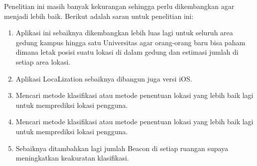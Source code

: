 Penelitian ini masih banyak kekurangan sehingga perlu dikembangkan agar menjadi lebih baik. Berikut adalah saran untuk penelitian ini:
\begin{enumerate}
	\item Aplikasi ini sebaiknya dikembangkan lebih luas lagi untuk seluruh area gedung kampus hingga satu Universitas agar orang-orang baru bisa paham dimana letak posisi suatu lokasi di dalam gedung dan estimasi jumlah di setiap area lokasi.
	\item Aplikasi LocaLization sebaiknya dibangun juga  versi iOS.
	\item Mencari metode klasifikasi atau metode penentuan lokasi yang lebih baik lagi untuk memprediksi lokasi pengguna.
	\item Mencari metode klasifikasi atau metode penentuan lokasi yang lebih baik lagi untuk memprediksi lokasi pengguna.
	\item Sebaiknya ditambahkan lagi jumlah Beacon di setiap ruangan supaya meningkatkan keakuratan klasifikasi.

\end{enumerate}

\fancyhf{}
\fancyfoot[R]{\thepage}
\begin{comment}

\end{comment}
